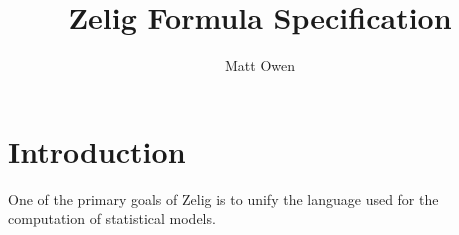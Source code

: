 \documentclass{article}
\title{Zelig Formula Specification}
\author{Matt Owen}
\begin{document}
\section{Introduction}

One of the primary goals of Zelig is to unify the language used for the computation of statistical models.
\end{document}
